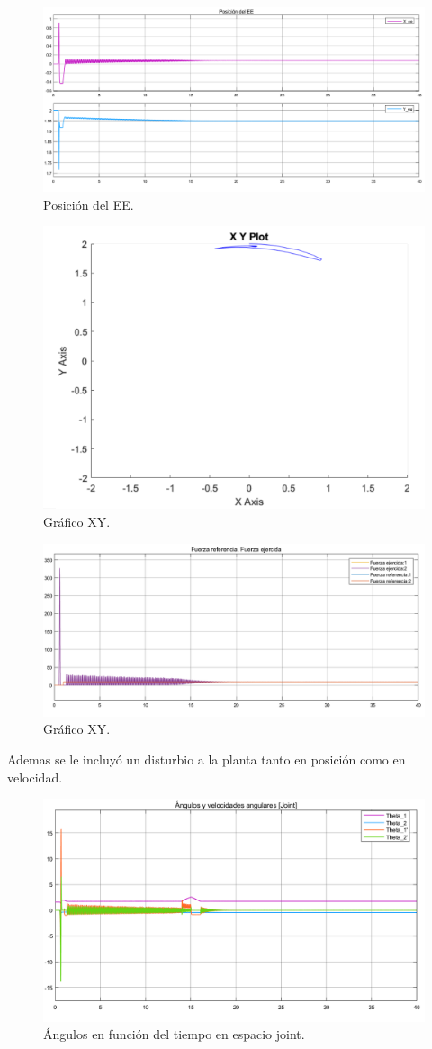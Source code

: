 \begin{figure}[H]
	\centering
	\includegraphics[width=0.8\linewidth]{ImagenesControl de fuerza no lineal/2_3_b}
	\caption{Posici\'on  del EE.}	
	\label{fig:apos}
\end{figure}
\begin{figure}[H]
	\centering
	\includegraphics[width=0.5\linewidth]{ImagenesControl de fuerza no lineal/2_3_c}
	\caption{Gr\'afico XY.}	
	\label{fig:axy}
\end{figure}
\begin{figure}[H]
	\centering
	\includegraphics[width=0.8\linewidth]{ImagenesControl de fuerza no lineal/2_3_e}
	\caption{Gr\'afico XY.}	
	\label{fig:af}
\end{figure}
Ademas se le incluy\'o un disturbio a la planta tanto en posici\'on como en velocidad.
\begin{figure}[H]
	\centering
	\includegraphics[width=0.8\linewidth]{ImagenesControl de fuerza no lineal/2_3_f_a}
	\caption{\'Angulos en funci\'on del tiempo en espacio joint.}	
	\label{fig:athetasd}
\end{figure}

